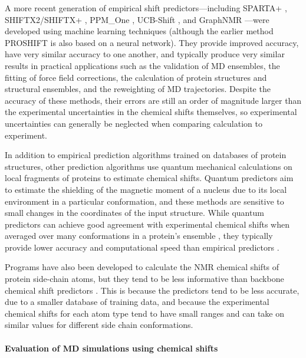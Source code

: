 \documentclass[9pt,review]{livecoms}
\begin{document}
A more recent generation of empirical shift predictors---including SPARTA+ \cite{shen_sparta_2010}, SHIFTX2/SHIFTX+ \cite{han_shiftx2_2011}, PPM\_One \cite{li_ppm_one_2015}, UCB-Shift \cite{li_accurate_2020,ptaszek_ucbshift_2024}, and GraphNMR \cite{yang_predicting_2021}---were developed using machine learning techniques (although the earlier method PROSHIFT \cite{meiler_proshift_2003} is also based on a neural network).
They provide improved accuracy, have very similar accuracy to one another, and typically produce very similar results in practical applications such as the validation of MD ensembles, the fitting of force field corrections, the calculation of protein structures and structural ensembles, and the reweighting of MD trajectories.
Despite the accuracy of these methods, their errors are still an order of magnitude larger than the experimental uncertainties in the chemical shifts themselves, so experimental uncertainties can generally be neglected when comparing calculation to experiment.

In addition to empirical prediction algorithms trained on databases of protein structures, other prediction algorithms use quantum mechanical calculations on local fragments of proteins to estimate chemical shifts.
Quantum predictors aim to estimate the shielding of the magnetic moment of a nucleus due to its local environment in a particular conformation, and these methods are sensitive to small changes in the coordinates of the input structure.
While quantum predictors can achieve good agreement with experimental chemical shifts when averaged over many conformations in a protein's ensemble \cite{yi_contribution_2024,yi_predicted_2024}, they typically provide lower accuracy and computational speed than empirical predictors \cite{mulder_nmr_2010,frank_toward_2012,sumowski_sensitivity_2014,fritz_determination_2018,case_using_2020,chandy_accurate_2020}.

Programs have also been developed to calculate the NMR chemical shifts of protein side-chain atoms, but they tend to be less informative than backbone chemical shift predictors \cite{han_shiftx2_2011,sahakyan_structure-based_2011,sahakyan_using_2011,li_ppm_one_2015,ptaszek_ucbshift_2024}.
This is because the predictors tend to be less accurate, due to a smaller database of training data, and because the experimental chemical shifts for each atom type tend to have small ranges and can take on similar values for different side chain conformations.

\paragraph{Evaluation of MD simulations using chemical shifts}
\end{document}
